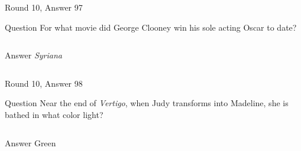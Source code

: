\documentclass[11pt]{beamer}
\begin{document}
\begin{frame}[t]{Round 10, Answer 97}
\vspace{2em}
\begin{block}{Question}
For what movie did George Clooney win his sole acting Oscar to date?
\end{block}
\pause{}
\begin{columns}[T,totalwidth=\linewidth]
\begin{column}{0.35\linewidth}
\begin{block}{Answer}
\emph{Syriana}
\end{block}
\end{column}
\begin{column}{0.6\linewidth}
\begin{center}
\texttt{[image: \{Images/syriana]}.jpg}
\end{center}
\end{column}
\end{columns}
\end{frame}
    

\begin{frame}[t]{Round 10, Answer 98}
\vspace{2em}
\begin{block}{Question}
Near the end of \emph{Vertigo}, when Judy transforms into Madeline, she is bathed in what color light?
\end{block}
\pause{}
\begin{columns}[T,totalwidth=\linewidth]
\begin{column}{0.35\linewidth}
\begin{block}{Answer}
Green
\end{block}
\end{column}
\begin{column}{0.6\linewidth}
\begin{center}
\texttt{[image: \{Images/vertigo-green]}.jpg}
\end{center}
\end{column}
\end{columns}
\end{frame}
    
\end{document}

